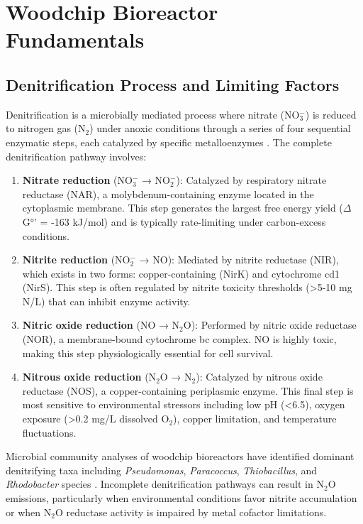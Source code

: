 \documentclass[12pt,a4paper]{article}
\begin{document}
\section{Woodchip Bioreactor Fundamentals}

\subsection{Denitrification Process and Limiting Factors}

Denitrification is a microbially mediated process where nitrate (NO$_{3}^{-}$) is reduced to nitrogen gas (N$_{2}$) under anoxic conditions through a series of four sequential enzymatic steps, each catalyzed by specific metalloenzymes \citep{RN242, RN629}. The complete denitrification pathway involves:

\begin{enumerate}
\item \textbf{Nitrate reduction} (NO$_{3}^{-}$ → NO$_{2}^{-}$): Catalyzed by respiratory nitrate reductase (NAR), a molybdenum-containing enzyme located in the cytoplasmic membrane. This step generates the largest free energy yield ($\Delta$G°' = -163 kJ/mol) and is typically rate-limiting under carbon-excess conditions.

\item \textbf{Nitrite reduction} (NO$_{2}^{-}$ → NO): Mediated by nitrite reductase (NIR), which exists in two forms: copper-containing (NirK) and cytochrome cd1 (NirS). This step is often regulated by nitrite toxicity thresholds (>5-10 mg N/L) that can inhibit enzyme activity.

\item \textbf{Nitric oxide reduction} (NO → N$_{2}$O): Performed by nitric oxide reductase (NOR), a membrane-bound cytochrome bc complex. NO is highly toxic, making this step physiologically essential for cell survival.

\item \textbf{Nitrous oxide reduction} (N$_{2}$O → N$_{2}$): Catalyzed by nitrous oxide reductase (NOS), a copper-containing periplasmic enzyme. This final step is most sensitive to environmental stressors including low pH (<6.5), oxygen exposure (>0.2 mg/L dissolved O$_2$), copper limitation, and temperature fluctuations.
\end{enumerate}

Microbial community analyses of woodchip bioreactors have identified dominant denitrifying taxa including \textit{Pseudomonas}, \textit{Paracoccus}, \textit{Thiobacillus}, and \textit{Rhodobacter} species \citep{RN239, RN1185}. Incomplete denitrification pathways can result in N$_2$O emissions, particularly when environmental conditions favor nitrite accumulation or when N$_2$O reductase activity is impaired by metal cofactor limitations.
\end{document}

